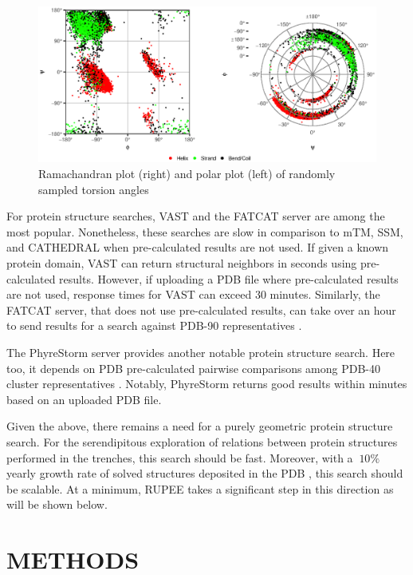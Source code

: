 \documentclass[letter,center,fleqn]{NAR}
\begin{document}
\begin{figure}[b]
\centering
\includegraphics{combined_torsion}
\caption{Ramachandran plot (right) and polar plot (left) of randomly sampled torsion angles}
\label{fig:combined_torsion}
\end{figure}

For protein structure searches, VAST \cite{Gilbrat1996} and the FATCAT server \cite{Ye2004} are among the most popular. 
Nonetheless, these searches are slow in comparison to mTM, SSM, and CATHEDRAL when pre-calculated results are not used. 
If given a known protein domain, VAST can return structural neighbors in seconds using pre-calculated results. 
However, if uploading a PDB file where pre-calculated results are not used, response times for VAST can exceed 30 minutes. 
Similarly, the FATCAT server, that does not use pre-calculated results, can take over an hour to send results for a search against PDB-90 representatives \cite{Prlic2010}. 

The PhyreStorm server \cite{Mezulis2016} provides another notable protein structure search.
Here too, it depends on PDB pre-calculated pairwise comparisons among PDB-40 cluster representatives \cite{Prlic2010}. 
Notably, PhyreStorm returns good results within minutes based on an uploaded PDB file. 

Given the above, there remains a need for a purely geometric protein structure search.
For the serendipitous exploration of relations between protein structures performed in the trenches, this search should be fast. 
Moreover, with a $~10\%$ yearly growth rate of solved structures deposited in the PDB \cite{gkw1000}, this search should be scalable. 
At a minimum, RUPEE takes a significant step in this direction as will be shown below. 

\section{METHODS}
\end{document}
